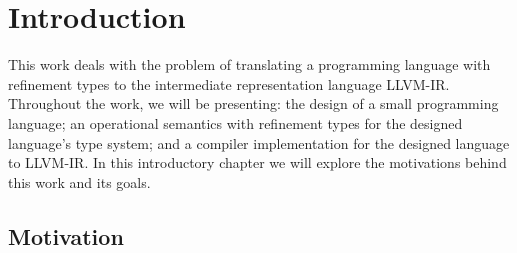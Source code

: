 \documentclass[
  english,
  lmodern,
  oneside
]{ufsc-thesis-rn46-2019/ufsc-thesis-rn46-2019}
\begin{document}
\begin{listadesimbolos}
\end{listadesimbolos}

\tableofcontents*

\textual{}

\chapter{Introduction}\label{chapter:introduction}

This work deals with the problem of translating a programming language with refinement types to the intermediate representation language LLVM-IR.\@
Throughout the work, we will be presenting: the design of a small programming language; an operational semantics with refinement types for the designed language's type system; and a compiler implementation for the designed language to LLVM-IR.\@
In this introductory chapter we will explore the motivations behind this work and its goals.

\section{Motivation}\label{chapter:introduction:sec:motivation}
\end{document}
